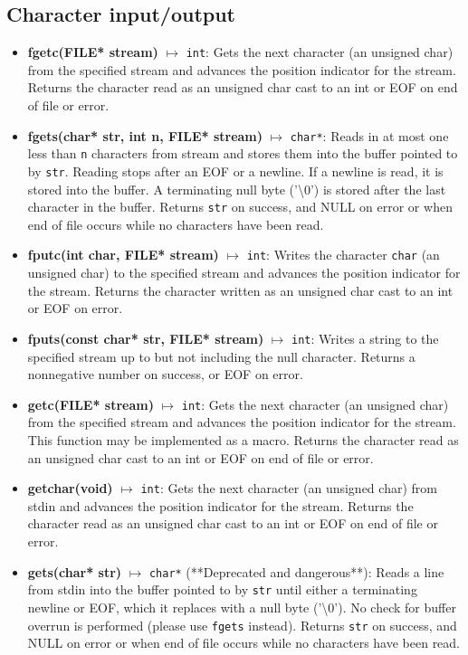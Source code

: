 \documentclass{report}
\begin{document}
    \subsection{Character input/output}
    \begin{itemize}
        \item \textbf{fgetc(FILE* stream)} $\mapsto$ \texttt{int}: Gets the next character (an unsigned char) from the specified stream and advances the position indicator for the stream. Returns the character read as an unsigned char cast to an int or EOF on end of file or error.
        \item \textbf{fgets(char* str, int n, FILE* stream)} $\mapsto$ \texttt{char*}: Reads in at most one less than \texttt{n} characters from stream and stores them into the buffer pointed to by \texttt{str}. Reading stops after an EOF or a newline. If a newline is read, it is stored into the buffer. A terminating null byte ('\textbackslash0') is stored after the last character in the buffer. Returns \texttt{str} on success, and NULL on error or when end of file occurs while no characters have been read.
        \item \textbf{fputc(int char, FILE* stream)} $\mapsto$ \texttt{int}: Writes the character \texttt{char} (an unsigned char) to the specified stream and advances the position indicator for the stream. Returns the character written as an unsigned char cast to an int or EOF on error.
        \item \textbf{fputs(const char* str, FILE* stream)} $\mapsto$ \texttt{int}: Writes a string to the specified stream up to but not including the null character. Returns a nonnegative number on success, or EOF on error.
        \item \textbf{getc(FILE* stream)} $\mapsto$ \texttt{int}: Gets the next character (an unsigned char) from the specified stream and advances the position indicator for the stream. This function may be implemented as a macro. Returns the character read as an unsigned char cast to an int or EOF on end of file or error.
        \item \textbf{getchar(void)} $\mapsto$ \texttt{int}: Gets the next character (an unsigned char) from stdin and advances the position indicator for the stream. Returns the character read as an unsigned char cast to an int or EOF on end of file or error.
        \item \textbf{gets(char* str)} $\mapsto$ \texttt{char*} (**Deprecated and dangerous**): Reads a line from stdin into the buffer pointed to by \texttt{str} until either a terminating newline or EOF, which it replaces with a null byte ('\textbackslash0'). No check for buffer overrun is performed (please use \texttt{fgets} instead). Returns \texttt{str} on success, and NULL on error or when end of file occurs while no characters have been read.

\end{itemize}
\end{document}
